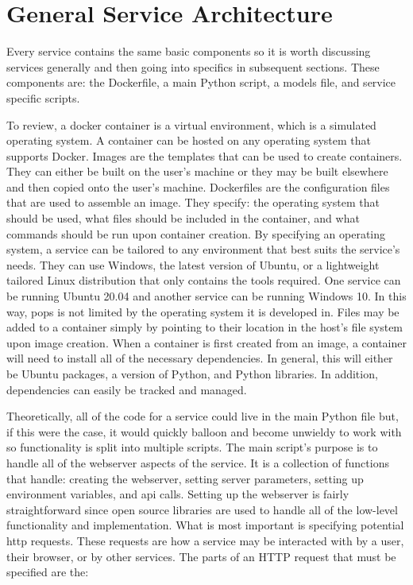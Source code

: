 
\section{General Service Architecture}

Every service contains the same basic components so it is worth discussing
services generally and then going into specifics in subsequent sections. These
components are: the Dockerfile, a main Python script, a models file, and
service specific scripts.

To review, a docker container is a virtual environment, which is a simulated
operating system. A container can be hosted on any operating system that
supports Docker. Images are the templates that can be used to create
containers. They can either be built on the user's machine or they may be built
elsewhere and then copied onto the user's machine. Dockerfiles are the
configuration files that are used to assemble an image. They specify: the
operating system that should be used, what files should be included in the
container, and what commands should be run upon container creation. By
specifying an operating system, a service can be tailored to any environment
that best suits the service's needs.  They can use Windows, the latest version
of Ubuntu, or a lightweight tailored Linux distribution that only contains the
tools required. One service can be running Ubuntu 20.04 and another service can
be running Windows 10. In this way, \gls{pops} is not limited by the operating
system it is developed in.  Files may be added to a container simply by
pointing to their location in the host's file system upon image creation. When
a container is first created from an image, a container will need to install
all of the necessary dependencies. In general, this will either be Ubuntu
packages, a version of Python, and Python libraries.  In addition, dependencies
can easily be tracked and managed. 

Theoretically, all of the code for a service could live in the main Python file
but, if this were the case, it would quickly balloon and become unwieldy to
work with so functionality is split into multiple scripts. The main script's
purpose is to handle all of the webserver aspects of the service. It is a
collection of functions that handle: creating the webserver, setting server
parameters, setting up environment variables, and \gls{api} calls.  Setting up
the webserver is fairly straightforward since open source libraries are used to
handle all of the low-level functionality and implementation. What is most
important is specifying potential \gls{http} requests. These requests are how a
service may be interacted with by a user, their browser, or by other services.
The parts of an HTTP request that must be specified are the: 

